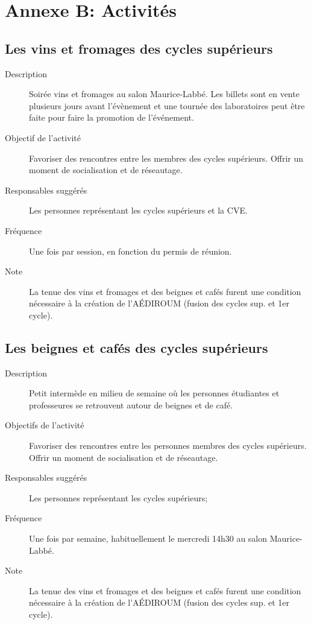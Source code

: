 \documentclass{aediroum}
\begin{document}
\section{Annexe B: Activités}\label{sec:activites}
\subsection{Les vins et fromages des cycles supérieurs}\label{sec:vins-et-fromages}
\begin{description}
	\item[Description] Soirée vins et fromages au salon Maurice-Labbé. Les billets sont en vente plusieurs jours avant l'évènement et une tournée des laboratoires peut être faite pour faire la promotion de l'événement.
	\item[Objectif de l'activité] Favoriser des rencontres entre les membres des cycles supérieurs. Offrir un moment de socialisation et de réseautage.
	\item[Responsables suggérés] Les personnes représentant les cycles supérieurs et la CVE.
	\item[Fréquence] Une fois par session, en fonction du permis de réunion.
	\item[Note] La tenue des vins et fromages et des beignes et cafés furent une condition nécessaire à la création de l'AÉDIROUM (fusion des cycles sup. et 1er cycle).
\end{description}

\subsection{Les beignes et cafés des cycles supérieurs}\label{sec:beignes-et-cafes}
\begin{description}
	\item[Description] Petit intermède en milieu de semaine où les personnes étudiantes et professeures se retrouvent autour de beignes et de café.
	\item[Objectifs de l'activité] Favoriser des rencontres entre les personnes membres des cycles supérieurs. Offrir un moment de socialisation et de réseautage.
	\item[Responsables suggérés] Les personnes représentant les cycles supérieurs;
	\item[Fréquence] Une fois par semaine, habituellement le mercredi 14h30 au salon Maurice-Labbé.
	\item[Note] La tenue des vins et fromages et des beignes et cafés furent une condition nécessaire à la création de l'AÉDIROUM (fusion des cycles sup. et 1er cycle).
\end{description}
\end{document}
